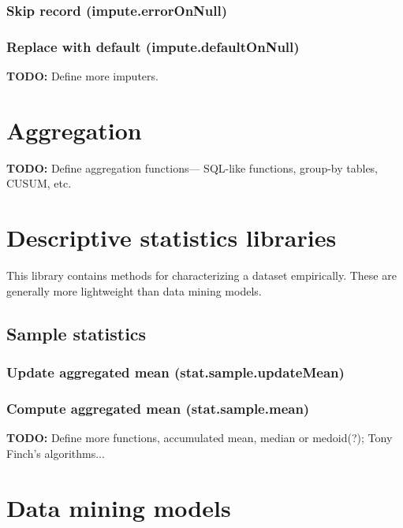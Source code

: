 \documentclass{article}
\theoremstyle{definition}
\begin{document}
\subsubsection{Skip record (impute.errorOnNull)}

\subsubsection{Replace with default (impute.defaultOnNull)}

{\bf TODO:} Define more imputers.

\pagebreak

\section{Aggregation}

{\bf TODO:} Define aggregation functions--- SQL-like functions, group-by tables, CUSUM, etc.

\pagebreak

\section{Descriptive statistics libraries}

This library contains methods for characterizing a dataset empirically.  These are generally more lightweight than data mining models.

\subsection{Sample statistics}

\subsubsection{Update aggregated mean (stat.sample.updateMean)}

\subsubsection{Compute aggregated mean (stat.sample.mean)}

{\bf TODO:} Define more functions, accumulated mean, median or medoid(?); Tony Finch's algorithms...

\pagebreak

\section{Data mining models}
\end{document}
